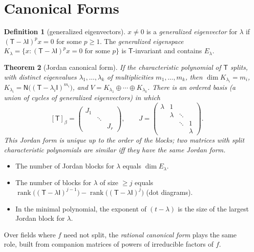 \documentclass[12pt]{article}
\newtheorem{theorem}{Theorem}[section]
\theoremstyle{definition}
\newtheorem{definition}[theorem]{Definition}
\theoremstyle{remark}
\newcommand{\N}{\mathsf{N}}
\newcommand{\T}{\mathsf{T}}
\newcommand{\I}{\mathsf{I}}
\DeclareMathOperator{\rank}{rank}
\begin{document}
\section{Canonical Forms}

\begin{definition}[generalized eigenvectors]
$x\neq0$ is a \emph{generalized eigenvector} for $\lambda$ if $(\T-\lambda\I)^px=0$ for some $p\ge1$.
The \emph{generalized eigenspace} $K_\lambda=\{x:(\T-\lambda\I)^px=0\text{ for some }p\}$ is $\T$-invariant and contains $E_\lambda$.
\end{definition}

\begin{theorem}[Jordan canonical form]
If the characteristic polynomial of $\T$ splits, with distinct eigenvalues $\lambda_1,\dots,\lambda_k$ of multiplicities $m_1,\dots,m_k$, then
$\dim K_{\lambda_i}=m_i$, $K_{\lambda_i}=\N\bigl((\T-\lambda_i\I)^{m_i}\bigr)$, and $V=K_{\lambda_1}\oplus\cdots\oplus K_{\lambda_k}$.
There is an ordered basis (a union of cycles of generalized eigenvectors) in which
\[
[\T]_\beta=\begin{pmatrix}J_1&&\\&\ddots&\\&&J_r\end{pmatrix},\qquad
J=\begin{pmatrix}\lambda&1&&\\&\lambda&\ddots&\\&&\ddots&1\\&&&\lambda\end{pmatrix}.
\]
This \emph{Jordan form} is unique up to the order of the blocks; two matrices with split characteristic polynomials are
similar iff they have the same Jordan form.
\end{theorem}

\begin{itemize}
  \item The number of Jordan blocks for $\lambda$ equals $\dim E_\lambda$.
  \item The number of blocks for $\lambda$ of size $\ge j$ equals $\rank\bigl((\T-\lambda\I)^{j-1}\bigr)-\rank\bigl((\T-\lambda\I)^{j}\bigr)$ (dot diagrams).
  \item In the minimal polynomial, the exponent of $(t-\lambda)$ is the size of the largest Jordan block for $\lambda$.
\end{itemize}
Over fields where $f$ need not split, the \emph{rational canonical form} plays the same role, built from companion matrices of
powers of irreducible factors of $f$.
\end{document}

